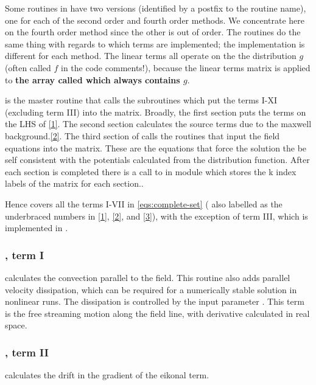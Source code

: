 \par
Some routines in  have two versions (identified by a postfix to the routine name), one for each of the second order and fourth order methods.  We concentrate here on the fourth order method since the other is out of order. The routines do the same thing with regards to which terms are implemented; the implementation is different for each method.  The linear terms all operate on the the distribution $g$ (often called $f$ in the code comments!), because the linear terms matrix is applied to \textbf{the array called  which always contains $g$}. 

\par
{} is the master routine that calls the subroutines which put the terms I-XI (excluding term III) into the matrix.  Broadly, the first section puts the terms on the LHS of \ref{1}.  The second section calculates the source terms due to the maxwell background.\ref{2}.  The third section of  calls the routines that input the field equations into the matrix. These are the equations that force the solution the be self consistent with the potentials calculated from the distribution function.  After each section is completed there is a call to  in module  which stores the k index labels of the matrix for each section..

\par
Hence  covers all the terms I-VII in \ref{eqs:complete-set} ( also labelled as the underbraced numbers in \ref{1}, \ref{2}, and \ref{3}), with the exception of term III, which is implemented in .

\subsubsection{, term I}
 calculates the convection parallel to the field.  This routine also adds parallel velocity dissipation, which can be required for a numerically stable solution in nonlinear runs.
The dissipation is controlled by the input parameter .  This term is the free streaming motion along the field line, with derivative calculated in real space.

\subsubsection{, term II}
 calculates the drift in the gradient of the eikonal term.

